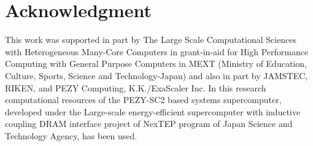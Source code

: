 \documentclass[conference]{IEEEtran}
\begin{document}


\section*{Acknowledgment}


This work was supported in part by The Large Scale Computational
Sciences with Heterogeneous Many-Core Computers in grant-in-aid for High
Performance Computing with General Purpose Computers in MEXT (Ministry
of Education, Culture, Sports, Science and Technology-Japan) and  also
in part by  JAMSTEC, RIKEN, and PEZY Computing,
K.K./ExaScaler Inc.
In this research computational resources of the PEZY-SC2 based systems supercomputer,
developed under the Large-scale energy-efficient supercomputer with
inductive coupling DRAM interface project of NexTEP program of Japan
Science and Technology Agency, has been used.









%
%
%




\end{document}
